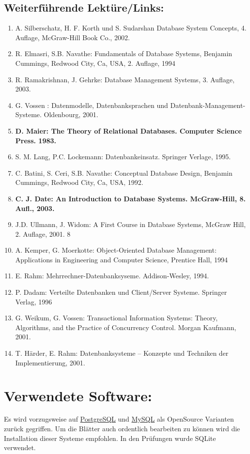 \subsection{Weiterführende Lektüre/Links:}
\begin{enumerate}
\item A. Silberschatz, H. F. Korth und S. Sudarshan Database System Concepts, 4. Auflage, McGraw-Hill Book Co., 2002.
\item R. Elmasri, S.B. Navathe: Fundamentals of Database Systems, Benjamin Cummings, Redwood City, Ca, USA, 2. Auflage, 1994
\item R. Ramakrishnan, J. Gehrke: Database Management Systems, 3. Auflage, 2003.
\item G. Vossen : Datenmodelle, Datenbanksprachen und Datenbank-Management-Systeme. Oldenbourg, 2001.
\item \textbf{D. Maier: The Theory of Relational Databases. Computer Science Press. 1983.}
\item S. M. Lang, P.C. Lockemann: Datenbankeinsatz. Springer Verlage, 1995.
\item C. Batini, S. Ceri, S.B. Navathe: Conceptual Database Design, Benjamin Cummings, Redwood City, Ca, USA, 1992.
\item \textbf{C. J. Date: An Introduction to Database Systems. McGraw-Hill, 8. Aufl., 2003.}
\item J.D. Ullmann, J. Widom: A First Course in Database Systems, McGraw Hill, 2. Auflage, 2001. 8
\item A. Kemper, G. Moerkotte: Object-Oriented Database Management: Applications in Engineering and Computer
Science, Prentice Hall, 1994 
\item E. Rahm: Mehrrechner-Datenbanksyseme. Addison-Wesley, 1994.
\item P. Dadam: Verteilte Datenbanken und Client/Server Systeme. Springer Verlag, 1996
\item G. Weikum, G. Vossen: Transactional Information Systems: Theory, Algorithms, and the Practice of Concurrency Control. Morgan Kaufmann, 2001.
\item T. Härder, E. Rahm: Datenbanksysteme – Konzepte und Techniken der Implementierung, 2001.

\end{enumerate}
\section{Verwendete Software:}
Es wird vorzugsweise auf \href{http://www.postgresql.org/}{PostgreSQL} und \href{http://www.mysql.de/}{MySQL} als OpenSource Varianten zurück gegriffen. Um die Blätter auch ordentlich bearbeiten zu können wird die Installation dieser Systeme empfohlen. In den Prüfungen wurde SQLite verwendet.